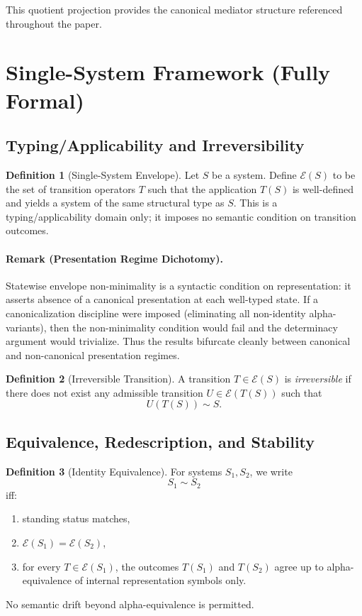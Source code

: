\documentclass[11pt]{article}
\theoremstyle{definition}
\newtheorem{definition}{Definition}
\begin{document}
This quotient projection provides the canonical mediator structure referenced throughout the paper.


\section{Single-System Framework (Fully Formal)}

\subsection{Typing/Applicability and Irreversibility}

\begin{definition}[Single-System Envelope]
Let $S$ be a system.
Define $\mathcal{E}(S)$ to be the set of transition operators $T$
such that the application $T(S)$ is well-defined and yields a system of the same structural type as $S$.
This is a typing/applicability domain only; it imposes no semantic condition on transition outcomes.
\end{definition}

\paragraph{Remark (Presentation Regime Dichotomy).}
Statewise envelope non-minimality is a syntactic condition on representation:
it asserts absence of a canonical presentation at each well-typed state.
If a canonicalization discipline were imposed (eliminating all non-identity alpha-variants),
then the non-minimality condition would fail and the determinacy argument would trivialize.
Thus the results bifurcate cleanly between canonical and non-canonical presentation regimes.


\begin{definition}[Irreversible Transition]
A transition $T \in \mathcal{E}(S)$ is \emph{irreversible} if there does not exist any admissible transition
$U \in \mathcal{E}(T(S))$ such that
\[
U(T(S)) \sim S.
\]
\end{definition}

\subsection{Equivalence, Redescription, and Stability}

\begin{definition}[Identity Equivalence]
For systems $S_1,S_2$, we write
\[
S_1 \sim S_2
\]
iff:
\begin{enumerate}[label=(\roman*)]
    \item standing status matches,
    \item $\mathcal{E}(S_1)=\mathcal{E}(S_2)$,
    \item for every $T\in \mathcal{E}(S_1)$, the outcomes $T(S_1)$ and $T(S_2)$ agree up to alpha-equivalence of internal representation symbols only.
\end{enumerate}
No semantic drift beyond alpha-equivalence is permitted.
\end{definition}
\end{document}
